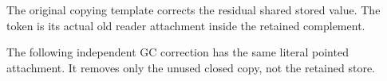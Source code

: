 The original copying template corrects the residual shared stored value. The token is its actual old reader attachment inside the retained complement.
\par{}

The following independent GC correction has the same literal pointed attachment. It removes only the unused closed copy, not the retained store.
\par{}


